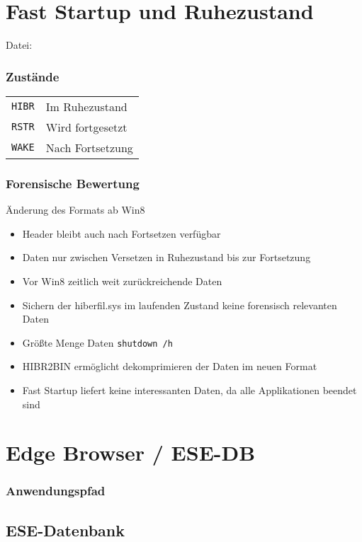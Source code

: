 \begin{multicols}{3}
\section{Fast Startup und Ruhezustand}
Datei: 
\subsubsection{Zustände}
\begin{tabular}{@{}p{\the\MyLen}%
		@{}p{\linewidth-\the\MyLen}@{}}
	\texttt{HIBR} & Im Ruhezustand\\
	\texttt{RSTR} & Wird fortgesetzt\\
	\texttt{WAKE} & Nach Fortsetzung\\
\end{tabular}

\subsubsection{Forensische Bewertung}
Änderung des Formats ab Win8
\begin{itemize}[leftmargin=*]
	\item Header bleibt auch nach Fortsetzen verfügbar
	\item Daten nur zwischen Versetzen in Ruhezustand bis zur Fortsetzung
	\item Vor Win8 zeitlich weit zurückreichende Daten
	\item Sichern der hiberfil.sys im laufenden Zustand keine forensisch relevanten Daten
	\item Größte Menge Daten \texttt{shutdown /h}
	\item HIBR2BIN ermöglicht dekomprimieren der Daten im neuen Format
	\item Fast Startup liefert keine interessanten Daten, da alle Applikationen beendet sind
\end{itemize}

\section{Edge Browser / ESE-DB}

\subsubsection{Anwendungspfad}

\subsection{ESE-Datenbank}

\end{multicols}
